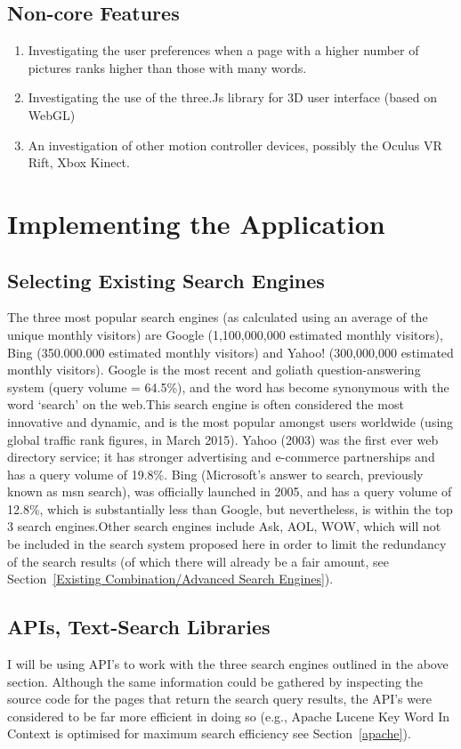 \documentclass[10pt]{article}
\begin{document}
\subsection{Non-core Features}
\begin{enumerate}

\item Investigating the user preferences when a page with a higher number of pictures ranks higher than those with many words. 
\item Investigating the use of the three.Js library for 3D user interface (based on WebGL)
\item An investigation of other motion controller devices, possibly the Oculus VR Rift, Xbox Kinect.

\end{enumerate}

\section{Implementing the Application}\label{api}
\subsection{Selecting Existing Search Engines} 
The three most popular search engines (as calculated using an average of the unique monthly visitors) are Google (1,100,000,000 estimated monthly visitors), Bing (350.000.000 estimated monthly visitors) and Yahoo! (300,000,000 estimated monthly visitors)\cite{ebiz}. Google is the most recent and goliath question-answering system (query volume = 64.5\%)\cite{adam}, and the word has become synonymous with the word ‘search’ on the web.This search engine is often considered the most innovative and dynamic, and is the most popular amongst users worldwide (using global traffic rank figures, in March 2015). Yahoo (2003) was the first ever web directory service; it has stronger advertising and e-commerce partnerships and has a query volume of 19.8\%. Bing (Microsoft’s answer to search, previously known as msn search), was officially launched in 2005, and has a query volume of 12.8\%, which is substantially less than Google, but nevertheless, is within the top 3 search engines.Other search engines include Ask, AOL, WOW, which will not be included in the search system proposed here in order to limit the redundancy of the search results (of which there will already be a fair amount, see Section~\ref{Existing Combination/Advanced Search Engines}). 

\subsection{APIs, Text-Search Libraries}
I will be using API’s to work with the three search engines outlined in the above section. Although the same information could be gathered by inspecting the source code for the pages that return the search query results, the API’s were considered to be far more efficient in doing so (e.g., Apache Lucene Key Word In Context is optimised for maximum search efficiency see Section~\ref{apache}). 
\end{document}
